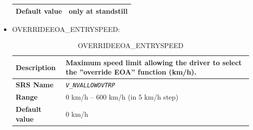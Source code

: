 \begin{itemize}
\begin{longtable}{|l|l|}
				\hline

					\begin{minipage}[t]{0.22\linewidth} \textbf{Default value}	\end{minipage}
				&	\begin{minipage}[t]{0.78\linewidth} only at standstill \end{minipage} \\

				\hline

			\end{longtable}
		\item OVERRIDEEOA\_ENTRYSPEED:

			\begin{longtable}{|l|l|}
				\caption{OVERRIDEEOA\_ENTRYSPEED}\\
				\hline

					\begin{minipage}[t]{0.22\linewidth} \textbf{Description}	\end{minipage}
				&	\begin{minipage}[t]{0.78\linewidth} Maximum speed limit allowing the driver to select the ”override EOA” function (km/h). \end{minipage} \\

				\hline

					\begin{minipage}[t]{0.22\linewidth} \textbf{SRS Name}	\end{minipage}
				&	\begin{minipage}[t]{0.78\linewidth} \emph{\texttt{V\_NVALLOWOVTRP}} \end{minipage} \\

				\hline

					\begin{minipage}[t]{0.22\linewidth} \textbf{Range}	\end{minipage}
				&	\begin{minipage}[t]{0.78\linewidth} 0 km/h – 600 km/h (in 5 km/h step) \end{minipage} \\

				\hline

					\begin{minipage}[t]{0.22\linewidth} \textbf{Default value}	\end{minipage}
				&	\begin{minipage}[t]{0.78\linewidth} 0 km/h \end{minipage} \\


\end{longtable}
\end{itemize}
